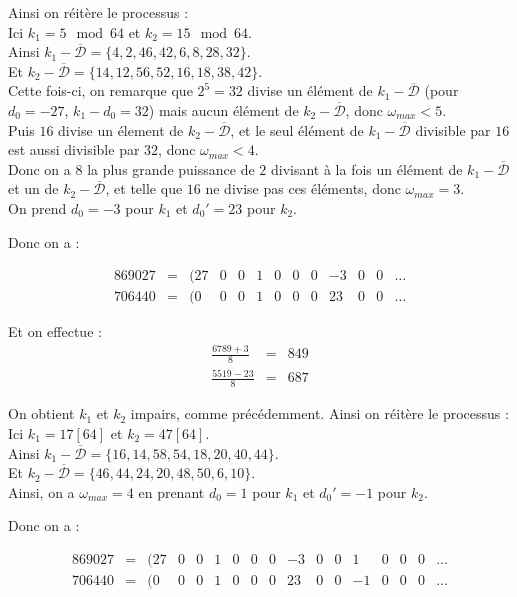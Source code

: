 \documentclass[12pt, a4paper]{memoir}
\newcommand{\dbarre}{\overline{\mathcal{D}}}
\begin{document}
 Ainsi on réitère le processus : \\
 Ici $k_1 = 5 \mod 64$ et $k_2 = 15 \mod 64$. \\
Ainsi  $k_1 - \dbarre = \{4,2,46,42,6,8,28,32\}$. \\
Et  $k_2 - \dbarre = \{14,12,56,52,16,18,38,42\}$. \\ 
 Cette fois-ci, on remarque que $2^5 = 32$ divise un élément de $k_1 - \dbarre$ (pour $d_0 = -27$, $k_1 - d_0 = 32$) 
 mais aucun élément de $k_2 - \dbarre$, donc $\omega_{max} < 5$. \\
Puis $16$ divise un élement de $k_2 - \dbarre$, et le seul élément de $k_1 - \dbarre$ divisible par $16$ est aussi
divisible par $32$, donc $\omega_{max} < 4$. \\
Donc on a $8$ la plus grande puissance de $2$ divisant à la fois un élément de $k_1 - \dbarre$
et un de $k_2 - \dbarre$, et telle que $16$ ne divise pas ces éléments, donc $\omega_{max} = 3$. \\
On prend $d_0 = -3$ pour $k_1$ et $d_0' = 23$ pour $k_2$.
 
Donc on a :
 
 $$\begin{array}{ccccccccccccc}
  869027 & = & (27 & 0 & 0 & 1 & 0 & 0 & 0 & -3 & 0 & 0 & \ldots \\
  706440 & = & (0 & 0 & 0 & 1 & 0 & 0 & 0 & 23 & 0 & 0 & \ldots
 \end{array}$$
 
 Et on effectue :
 $$\begin{array}{cccccc}
  \frac{6789 + 3}{8} & = & 849 \\
  \frac{5519-23}{8} & = & 687
 \end{array}$$
 
 On obtient $k_1$ et $k_2$ impairs, comme précédemment. Ainsi on réitère le processus : \\
 Ici $k_1 = 17 [64]$ et $k_2 = 47 [64]$. \\
Ainsi  $k_1 - \dbarre = \{16,14,58,54,18,20,40,44\}$. \\
Et  $k_2 - \dbarre = \{46,44,24,20,48,50,6,10\}$. \\ 
 Ainsi, on a $\omega_{max} = 4$ en prenant $d_0 = 1$ pour $k_1$ et $d_0' = -1$ pour $k_2$.

Donc on a :
 
 $$\begin{array}{ccccccccccccccccc}
  869027 & = & (27 & 0 & 0 & 1 & 0 & 0 & 0 & -3 & 0 & 0 & 1 & 0 & 0 & 0 & \ldots \\
  706440 & = & (0 & 0 & 0 & 1 & 0 & 0 & 0 & 23 & 0 & 0 & -1 & 0 & 0 & 0 & \ldots
 \end{array}$$
 
\end{document}

